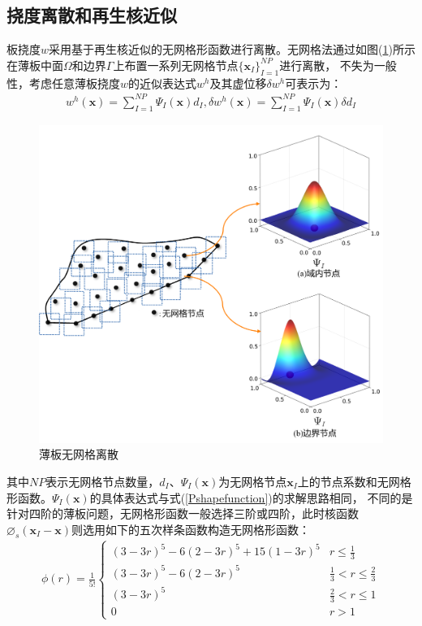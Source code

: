 \subsection{挠度离散和再生核近似}
板挠度$w$采用基于再生核近似的无网格形函数进行离散。无网格法通过如图(\ref{PPSI})所示在薄板中面$\Omega$和边界$\Gamma$上布置一系列无网格节点$\{\pmb{x}_I\}^{N\!P}_{I=1}$进行离散，
不失为一般性，考虑任意薄板挠度$w$的近似表达式$w^h$及其虚位移$\delta w^h$可表示为：
\begin{equation}\label{w}
\begin{split}
    w^h(\pmb{x})=\sum_{I=1}^{N\!P}\Psi_I(\pmb{x})d_{I},\delta w^h(\pmb{x})=\sum_{I=1}^{N\!P}\Psi_I(\pmb{x})\delta d_I
\end{split}
\end{equation}
\begin{figure}[!h]
    \centering
    \includegraphics[scale=0.5]{figure/P/PSI.png}
    \caption{薄板无网格离散}\label{PPSI}
\end{figure}
其中$N\!P$表示无网格节点数量，$d_I$、$\Psi_I(\pmb{x})$为无网格节点$\pmb{x}_I$上的节点系数和无网格形函数。$\Psi_I(\pmb{x})$的具体表达式与式(\ref{Pshapefunction})的求解思路相同，
不同的是针对四阶的薄板问题，无网格形函数一般选择三阶或四阶，此时核函数$\varnothing_s(\pmb{x}_I-\pmb{x})$则选用如下的五次样条函数构造无网格形函数：
\begin{equation}
\begin{split}
        \phi(r)=\frac{1}{5!}
\begin{cases}
        (3-3r)^5-6(2-3r)^5+15(1-3r)^5&r\le\frac{1}{3}\\
        (3-3r)^5-6(2-3r)^5&\frac{1}{3}<r\le\frac{2}{3}\\
        (3-3r)^5&\frac{2}{3}<r\le1\\
        0&r>1
\end{cases}
\end{split}
\end{equation}
